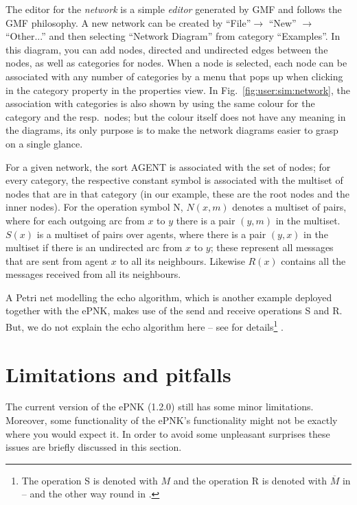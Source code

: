 The editor for the \emph{network}%
is a simple \emph{editor} generated by GMF
and follows the GMF philosophy. A new network can be created by
``File''$\rightarrow$ ``New''  $\rightarrow$ ``Other...'' and then
selecting ``Network Diagram'' from category ``Examples''. In this
diagram, you can add nodes, directed and undirected edges between the
nodes, as well as categories for nodes. When a node is selected,
each node can be associated with any number of categories by
a menu that pops up when clicking in the category property in
the properties view. In Fig.~\ref{fig:user:sim:network}, the
association with categories is also shown by using the same colour for
the category and the resp.\ nodes; but the colour itself does not have
any meaning in the diagrams, its only purpose is to make the network diagrams
easier to grasp on a single glance.

For a given network, the sort {\sf AGENT} is associated with
the set of nodes; for every category, the respective constant
symbol is associated with the multiset of nodes that are in
that category (in our example, these are the root nodes and
the inner nodes). For the operation symbol {\sf N}, 
$N(x,m)$ denotes a multiset of pairs, where for each outgoing
arc from $x$ to $y$ there is a pair $(y,m)$ in the multiset.
$S(x)$ is a multiset of pairs over agents, where there
is a pair $(y,x)$ in the multiset if there is an undirected
arc from $x$ to $y$; these represent all messages that are
sent from agent $x$ to all its neighbours. Likewise $R(x)$ contains
all the messages received from all its neighbours. 

A Petri net modelling the echo algorithm,%
which is another example deployed together with the ePNK, makes use of the send
and receive operations {\sf S} and {\sf R}. But, we do not explain the echo
algorithm here -- see \cite{WWea97, KRVW97} for details\footnote
  {The operation {\sf S} is denoted with $M$ and the
   operation {\sf R} is denoted with $\overline{M}$ in \cite{KRVW97} -- and
   the other way round in \cite{WWea97}.}%
.%


\section{Limitations and pitfalls}  

The current version of the ePNK (1.2.0) still has some minor limitations.
Moreover, some functionality of the ePNK's functionality might
not be exactly where you would expect it.  In order to avoid some
unpleasant surprises these issues are briefly discussed in this section. 
  
